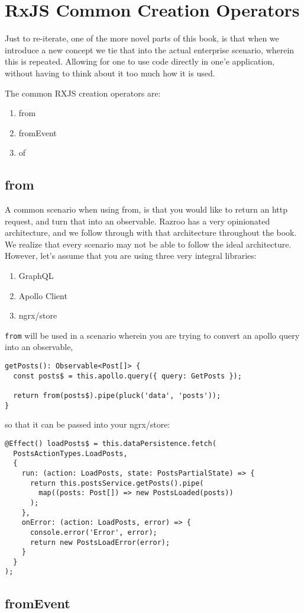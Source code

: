 \chapter{RxJS Common Creation Operators}
Just to re-iterate, one of the more novel parts of this book, is that when we 
introduce a new concept we tie that into the actual enterprise scenario, 
wherein this is repeated. Allowing for one to use code directly in one'e 
application, without having to think about it too much how it is used. 

The common RXJS creation operators are: 
\begin{enumerate}
  \item from
  \item fromEvent
  \item of
\end{enumerate}

\section{from}
A common scenario when using from, is that you would like to return an http 
request, and turn that into an observable. Razroo has a very opinionated 
architecture, and we follow through with that architecture throughout the 
book. We realize that every scenario may not be able to follow the ideal
architecture. However, let's assume that you are using three very integral
libraries: 
\begin{enumerate}
  \item GraphQL 
  \item Apollo Client
  \item ngrx/store
\end{enumerate}

\lstinline{from} will be used in a scenario wherein you are trying to convert 
an apollo query into an observable, 

\begin{lstlisting}[caption=posts.service.ts]
getPosts(): Observable<Post[]> {
  const posts$ = this.apollo.query({ query: GetPosts });

  return from(posts$).pipe(pluck('data', 'posts'));
}
\end{lstlisting}

so that it can be passed into your ngrx/store:

\begin{lstlisting}[caption=posts.effects.ts]
@Effect() loadPosts$ = this.dataPersistence.fetch(
  PostsActionTypes.LoadPosts,
  {
    run: (action: LoadPosts, state: PostsPartialState) => {
      return this.postsService.getPosts().pipe(
        map((posts: Post[]) => new PostsLoaded(posts))
      );
    },
    onError: (action: LoadPosts, error) => {
      console.error('Error', error);
      return new PostsLoadError(error);
    }
  }
);
\end{lstlisting}

\section{fromEvent}